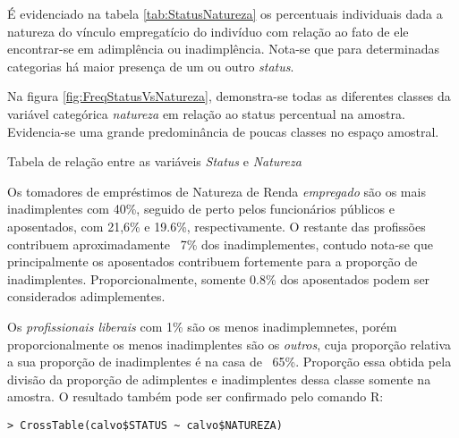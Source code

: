 É evidenciado na tabela \ref{tab:StatusNatureza} os percentuais individuais dada a natureza do vínculo empregatício
do indivíduo com relação ao fato de ele encontrar-se em adimplência ou inadimplência. Nota-se que para determinadas categorias 
há maior presença de um ou outro \emph{status}. 

Na figura \ref{fig:FreqStatusVsNatureza}, demonstra-se todas as diferentes classes da variável categórica \emph{natureza} em relação ao status percentual na amostra. Evidencia-se uma grande predominância de poucas classes no espaço amostral.

\begin{table}[h]
\centering

\caption{\label{tab:StatusNatureza}Tabela de relação entre as variáveis \emph{Status
}e \emph{Natureza}}
\end{table}

Os tomadores de empréstimos de Natureza de Renda \emph{empregado} são os mais inadimplentes com 40\%, seguido de perto
pelos funcionários públicos e aposentados, com 21,6\% e 19.6\%, respectivamente. O restante das profissões contribuem aproximadamente ~7\% dos inadimplementes, contudo nota-se que principalmente os aposentados contribuem fortemente para a proporção de inadimplentes. Proporcionalmente, somente 0.8\% dos aposentados podem ser considerados adimplementes.

Os \emph{profissionais liberais} com 1\% são os menos inadimplemnetes, porém proporcionalmente os menos inadimplentes são os \emph{outros}, cuja proporção relativa a sua proporção de inadimplentes é na casa de ~65\%. Proporção essa obtida pela divisão da proporção de adimplentes e inadimplentes dessa classe somente na amostra. O resultado também pode ser confirmado pelo comando
R:

\begin{verbatim}
> CrossTable(calvo$STATUS ~ calvo$NATUREZA)
\end{verbatim}
